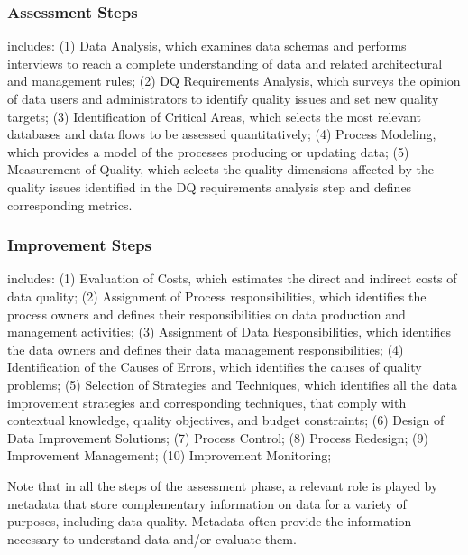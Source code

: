 \documentclass[pdftex,english,oribibl]{llncs}
\begin{document}
\subsubsection{Assessment Steps}
includes:
(1) Data Analysis, which examines data schemas and performs interviews to reach a complete understanding of data and related architectural and management rules;
(2) DQ Requirements Analysis, which surveys the opinion of data users and administrators to identify quality issues and set new quality targets;
(3) Identification of Critical Areas, which selects the most relevant databases and data flows to be assessed quantitatively;
(4) Process Modeling, which provides a model of the processes producing or updating data;
(5) Measurement of Quality, which selects the quality dimensions affected by the quality issues identified in the DQ requirements analysis step and defines corresponding metrics.
\begin{comment}
measurement can be objective when it is based on quantitative metrics, or subjective, when it is based on qualitative evaluations by data administrators and users.
\end{comment}

\subsubsection{Improvement Steps}
includes:
(1) Evaluation of Costs, which estimates the direct and indirect costs of data quality;
(2) Assignment of Process responsibilities, which identifies the process owners and defines their responsibilities on data production and management activities;
(3) Assignment of Data Responsibilities, which identifies the data owners and defines their data management responsibilities;
(4) Identification of the Causes of Errors, which identifies the causes of quality problems;
(5) Selection of Strategies and Techniques, which identifies all the data improvement strategies and corresponding techniques, that comply with contextual knowledge, quality objectives, and budget constraints;
(6) Design of Data Improvement Solutions;
(7) Process Control;
(8) Process Redesign;
(9) Improvement Management;
(10) Improvement Monitoring;

\begin{comment}
(6) Design of Data Improvement Solutions, which selects the most effective and efficient strategy and related set of techniques and tools to improve data quality;
(7) Process Control, which defines check points in the data production processes, to monitor quality during process execution;
(8) Process Redesign, which defines the process improvement actions that can deliver corresponding DQ improvements;
(9) Improvement Management, which defines new organizational rules for data quality;
(10) Improvement Monitoring, which establishes periodic monitoring activities that provide feedback on the results of the improvement process and enables its dynamic tuning.
\end{comment}
Note that in all the steps of the assessment phase, a relevant role is played by metadata that store complementary information on data for a variety of purposes, including data quality. Metadata often provide the information necessary to understand data and/or evaluate them.
\end{document}
